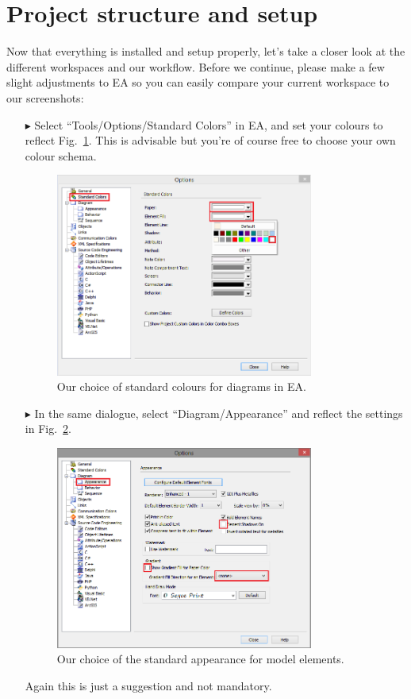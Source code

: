 \section{Project structure and setup}
Now that everything is installed and setup properly, let's take a closer look at the different workspaces and our workflow.
Before we continue, please make a few slight adjustments to EA so you can easily compare your current workspace to our screenshots:
\begin{itemize} 

\item[$\blacktriangleright$] Select ``Tools/Options/Standard Colors'' in EA, and set your colours to reflect Fig.~\ref{fig_standardColoursEA}.
This is advisable but you're of course free to choose your own colour schema.
\begin{figure}[htbp]
  \centering
  \includegraphics[width=0.8\textwidth]{../installation_images/standardColours}
  \caption{Our choice of standard colours for diagrams in EA.}
  \label{fig_standardColoursEA}
\end{figure}

\item[$\blacktriangleright$] In the same dialogue, select ``Diagram/Appearance'' and reflect the settings in Fig.~\ref{fig_standardAppearanceEA}.
\begin{figure}[htbp]
  \centering
  \includegraphics[width=0.8\textwidth]{../installation_images/standardAppearance}
  \caption{Our choice of the standard appearance for model elements.}
  \label{fig_standardAppearanceEA}
\end{figure}
Again this is just a suggestion and not mandatory.


\end{itemize}
